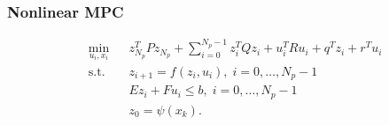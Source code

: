 \subsubsection{Nonlinear MPC}

\begin{equation}
\begin{aligned}
& \underset{u_{i} , x_{i}}{\text{min}}
& & z_{N_p}^{T} P z_{N_p} + \sum_{i=0}^{N_p - 1} z_i^T Q z_i + u_i^T R u_i + q^T z_i + r^T u_i\\
& \text{s.t.}
& & z_{i+1} = f( z_i , u_i ) , \; i = 0 , \ldots , N_p - 1 \\
&&& E z_i + F u_i \leq b , \; i = 0 , \ldots , N_p - 1 \\
&&& z_0 = \psi(x_k).
\end{aligned}
\end{equation}